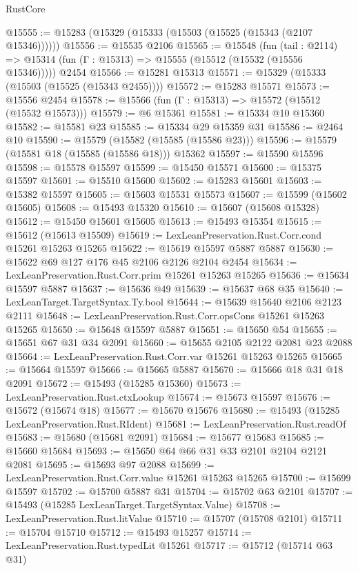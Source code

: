 \begin{lexlean}{RustCore}
\begin{coremodule}
@15555 := @15283 (@15329 (@15333 (@15503 (@15525 (@15343 (@2107 @15346))))))
@15556 := @15535 @2106
@15565 := @15548
    (fun (tail : @2114) => @15314 (fun (Γ : @15313) => @15555 (@15512 (@15532 (@15556 @15346)))))
    @2454
@15566 := @15281 @15313
@15571 := @15329 (@15333 (@15503 (@15525 (@15343 @2455))))
@15572 := @15283 @15571
@15573 := @15556 @2454
@15578 := @15566 (fun (Γ : @15313) => @15572 (@15512 (@15532 @15573)))
@15579 := @6 @15361
@15581 := @15334 @10 @15360
@15582 := @15581 @23
@15585 := @15334 @29 @15359 @31
@15586 := @2464 @10
@15590 := @15579 (@15582 (@15585 (@15586 @23)))
@15596 := @15579 (@15581 @18 (@15585 (@15586 @18))) @15362
@15597 := @15590 @15596
@15598 := @15578 @15597
@15599 := @15450 @15571
@15600 := @15375 @15597
@15601 := @15510 @15600
@15602 := @15283 @15601
@15603 := @15382 @15597
@15605 := @15603 @15531 @15573
@15607 := @15599 (@15602 @15605)
@15608 := @15493 @15320
@15610 := @15607 (@15608 @15328)
@15612 := @15450 @15601 @15605
@15613 := @15493 @15354
@15615 := @15612 (@15613 @15509)
@15619 := LexLeanPreservation.Rust.Corr.cond @15261 @15263 @15265
@15622 := @15619 @15597 @5887 @5887
@15630 := @15622 @69 @127 @176 @45 @2106 @2126 @2104 @2454
@15634 := LexLeanPreservation.Rust.Corr.prim @15261 @15263 @15265
@15636 := @15634 @15597 @5887
@15637 := @15636 @49
@15639 := @15637 @68 @35
@15640 := LexLeanTarget.TargetSyntax.Ty.bool
@15644 := @15639 @15640 @2106 @2123 @2111
@15648 := LexLeanPreservation.Rust.Corr.opsCons @15261 @15263 @15265
@15650 := @15648 @15597 @5887
@15651 := @15650 @54
@15655 := @15651 @67 @31 @34 @2091
@15660 := @15655 @2105 @2122 @2081 @23 @2088
@15664 := LexLeanPreservation.Rust.Corr.var @15261 @15263 @15265
@15665 := @15664 @15597
@15666 := @15665 @5887
@15670 := @15666 @18 @31 @18 @2091
@15672 := @15493 (@15285 @15360)
@15673 := LexLeanPreservation.Rust.ctxLookup
@15674 := @15673 @15597
@15676 := @15672 (@15674 @18)
@15677 := @15670 @15676
@15680 := @15493 (@15285 LexLeanPreservation.Rust.RIdent)
@15681 := LexLeanPreservation.Rust.readOf
@15683 := @15680 (@15681 @2091)
@15684 := @15677 @15683
@15685 := @15660 @15684
@15693 := @15650 @64 @66 @31 @33 @2101 @2104 @2121 @2081
@15695 := @15693 @97 @2088
@15699 := LexLeanPreservation.Rust.Corr.value @15261 @15263 @15265
@15700 := @15699 @15597
@15702 := @15700 @5887 @31
@15704 := @15702 @63 @2101
@15707 := @15493 (@15285 LexLeanTarget.TargetSyntax.Value)
@15708 := LexLeanPreservation.Rust.litValue
@15710 := @15707 (@15708 @2101)
@15711 := @15704 @15710
@15712 := @15493 @15257
@15714 := LexLeanPreservation.Rust.typedLit @15261
@15717 := @15712 (@15714 @63 @31)

\end{coremodule}
\end{lexlean}

